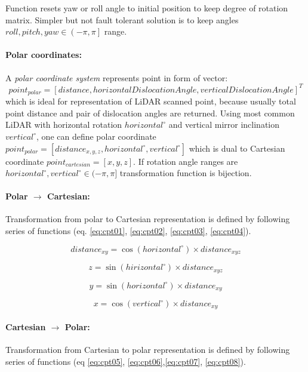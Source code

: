 \noindent Function resets yaw or roll angle to initial position to keep degree of rotation matrix. Simpler but not fault tolerant solution is to keep angles $roll,pitch,yaw \in \left (  -\pi,\pi\right ]$ range.


\paragraph{Polar coordinates:} A \emph{polar coordinate system} represents point in form of vector:
\begin{equation*}
    point_{polar}=[distance, horizontal Dislocation Angle, vertical Dislocation Angle]^T
\end{equation*}
which is ideal for representation of LiDAR scanned point, because usually total point distance and pair of dislocation angles are returned. Using most common LiDAR with horizontal rotation $horizontal^\circ$ and vertical mirror inclination $vertical^\circ$, one can define polar coordinate $point_{polar} = [distance_{x,y,z},horizontal^\circ,vertical^\circ]$ which is dual to Cartesian coordinate $point_{cartesian} = [x,y,z]$. If rotation angle  ranges are $horizontal^\circ,vertical^\circ\in(-\pi,\pi]$ transformation function is bijection.

\paragraph{Polar $\to$ Cartesian:} Transformation from polar to Cartesian representation is defined by following series of functions (eq. \ref{eq:cpt01}, \ref{eq:cpt02}, \ref{eq:cpt03}, \ref{eq:cpt04}).

\begin{equation}\label{eq:cpt01}
    distance_{xy} = \cos(horizontal^\circ)\times distance_{xyz}
\end{equation}

\begin{equation}\label{eq:cpt02}
    z = \sin(hirizontal^\circ)\times distance_{xyz}
\end{equation}

\begin{equation}\label{eq:cpt03}
    y = \sin(horizontal^\circ)\times distance_{xy}
\end{equation}

\begin{equation}\label{eq:cpt04}
    x = \cos(vertical^\circ) \times distance_{xy}
\end{equation}


\paragraph{Cartesian $\to$ Polar:} Transformation from Cartesian to polar representation is defined by following series of functions (eq \ref{eq:cpt05}, \ref{eq:cpt06},\ref{eq:cpt07}, \ref{eq:cpt08}).

